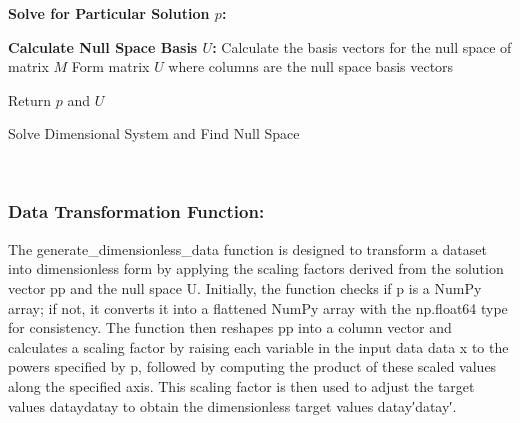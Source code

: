 \documentclass{article}
\begin{document}
\begin{algorithm}[H]
\SetAlgoLined
{}

\textbf{Solve for Particular Solution \(p\):}\;

\textbf{Calculate Null Space Basis \(U\):}\;
Calculate the basis vectors for the null space of matrix \(M\)\;
Form matrix \(U\) where columns are the null space basis vectors\;

Return \(p\) and \(U\)\;

\caption{Solve Dimensional System and Find Null Space}
\label{alg:solve_dimension} %
\end{algorithm}\\






\subsubsection{Data Transformation Function:}


The generate\_dimensionless\_data function is designed to transform a dataset into dimensionless form by applying the scaling factors derived from the solution vector pp and the null space U. Initially, the function checks if p is a NumPy array; if not, it converts it into a flattened NumPy array with the np.float64 type for consistency. The function then reshapes pp into a column vector and calculates a scaling factor by raising each variable in the input data data x to the powers specified by p, followed by computing the product of these scaled values along the specified axis. This scaling factor is then used to adjust the target values dataydatay​ to obtain the dimensionless target values datay′datay′.\\
\end{document}

